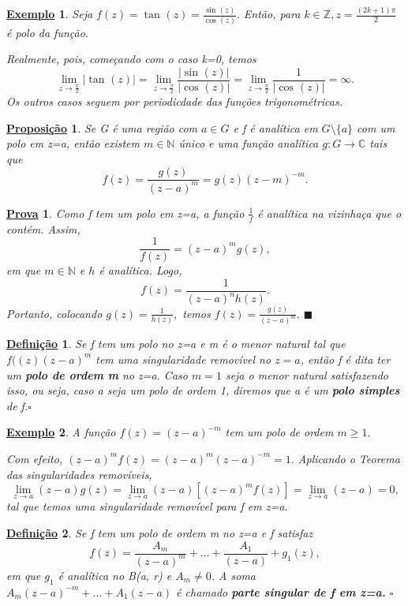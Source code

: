 \documentclass{article}
\newtheorem*{def*}{\underline{Defini\c c\~ao}}
\newtheorem{example}{\underline{Exemplo}}[section]
\newtheorem*{proof*}{\underline{Prova}}
\newtheorem*{prop*}{\underline{Proposi\c c\~ao}}
\renewcommand\qedsymbol{$\blacksquare$}
\begin{document}
  \begin{example}
    Seja \(f(z) = \tan^{}{(z)} = \frac{\sin^{}{(z)}}{\cos^{}{(z)}}.\) Então, para \(k\in \mathbb{Z}, z = \frac{(2k+1)\pi }{2}\) é polo da função.

    Realmente, pois, começando com o caso k=0, temos 
    \[
      \lim_{z\to \frac{\pi }{2}}|\tan^{}{(z)}| = \lim_{z\to \frac{\pi }{2}}\frac{|\sin^{}{(z)}|}{|\cos^{}{(z)}|} = \lim_{z\to \frac{\pi }{2}} \frac{1}{|\cos^{}{(z)}|} = \infty.
    \] 
    Os outros casos seguem por periodicdade das funções trigonométricas.
  \end{example}
  \begin{prop*}
    Se G é uma região com \(a\in G\) e f é analítica em \(G\setminus{\{a\}}\) com um polo em z=a, então existem \(m\in \mathbb{N}\) único e uma função
    analítica \(g:G\rightarrow \mathbb{C}\) tais que 
    \[
      f(z) = \frac{g(z)}{(z-a)^{m}} = g(z)(z-m)^{-m}.
    \]
  \end{prop*}
  \begin{proof*}
    Como f tem um polo em z=a, a função \(\frac{1}{f}\) é analítica na vizinhaça que o contém. Assim, 
    \[
      \frac{1}{f(z)} = (z-a)^{m}g(z),
    \]
    em que \(m\in \mathbb{N}\) e \(h\) é analítica. Logo,
    \[
      f(z) = \frac{1}{(z-a)^{n}h(z)}.
    \]
    Portanto, colocando \(g(z) = \frac{1}{h(z)},\) temos \(f(z) = \frac{g(z)}{(z-a)^{m}}.\) \qedsymbol
  \end{proof*}
  \begin{def*}
    Se f tem um polo no z=a e m é o menor natural tal que \(f((z)(z-a)^{m}\) tem uma singularidade removível no \(z=a\), então f é dita ter
    um \textbf{polo de ordem m} no z=a. Caso \(m=1\) seja o menor natural satisfazendo isso, ou seja, caso a seja um polo de ordem 1, diremos que a é um \textbf{polo simples} de f.\(\square\)
  \end{def*}
  \begin{example}
    A função \(f(z) = (z-a)^{-m}\) tem um polo de ordem \(m\geq 1.\)

    Com efeito, \((z-a)^{m}f(z) = (z-a)^{m}(z-a)^{-m} = 1.\) Aplicando o Teorema das singularidades removíveis,
    \[
      \lim_{z\to a}(z-a)g(z)=\lim_{z\to a}(z-a)[(z-a)^{m}f(z)] = \lim_{z\to a}(z-a)=0,
    \]
    tal que temos uma singularidade removível para f em z=a. 
  \end{example}
  \begin{def*}
    Se f tem um polo de ordem m no z=a e f satisfaz 
    \[
      f(z) = \frac{A_{m}}{(z-a)^{m}}+\dotsc +\frac{A_{1}}{(z-a)} + g_{1}(z),
    \]
    em que \(g_{1}\) é analítica no B(a, r) e \(A_{m}\neq0\). A soma \(A_{m}(z-a)^{-m}+\dotsc +A_{1}(z-a)\) é chamado
    \textbf{parte singular de f em z=a.} \(\square\)
  \end{def*}
  \newpage
\end{document}
